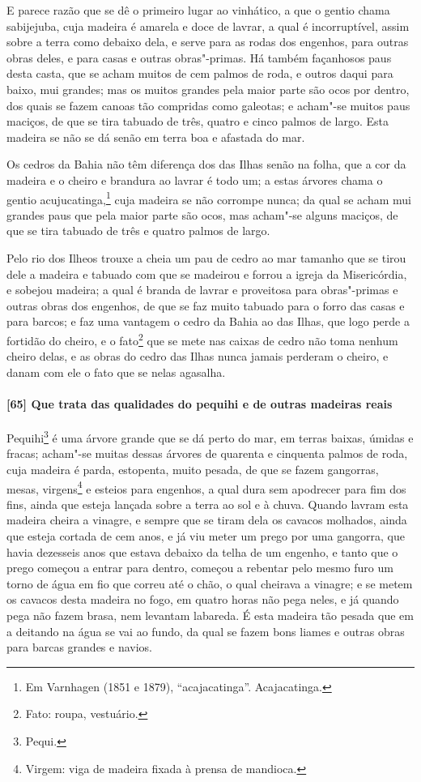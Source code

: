 E parece razão que se dê o primeiro lugar ao vinhático, a que o gentio chama sabijejuba,
cuja madeira é amarela e doce de lavrar, a qual é incorruptível, assim sobre a terra como
debaixo dela, e serve para as rodas dos engenhos, para outras obras deles, e para casas e
outras obras"-primas. Há também façanhosos paus desta casta, que se acham muitos de cem
palmos de roda, e outros daqui para baixo, mui grandes; mas os muitos grandes pela maior
parte são ocos por dentro, dos quais se fazem canoas tão compridas
como galeotas; e acham"-se muitos paus maciços, de que se tira tabuado de três, quatro e
cinco palmos de largo. Esta madeira se não se dá senão em terra boa e afastada do mar.


Os cedros da Bahia não têm diferença dos das Ilhas senão na folha, que a cor da madeira e
o cheiro e brandura ao lavrar é todo um; a estas árvores chama o gentio
acujucatinga,\footnote{ Em Varnhagen (1851 e 1879), ``acajacatinga''. Acajacatinga.} cuja
madeira se não corrompe nunca; da qual se acham mui grandes paus que pela maior parte são
ocos, mas acham"-se alguns maciços, de que se tira tabuado de três e quatro palmos de
largo.

Pelo rio dos Ilheos trouxe a cheia um pau de cedro ao mar tamanho que se tirou dele a
madeira e tabuado com que se madeirou e forrou a igreja da Misericórdia, e sobejou
madeira; a qual é branda de lavrar e proveitosa para obras"-primas e outras obras dos
engenhos, de que se faz muito tabuado para o forro das casas e para barcos; e faz uma
vantagem o cedro da Bahia ao das Ilhas, que logo perde a fortidão do cheiro, e o
fato\footnote{ Fato: roupa, vestuário.} que se mete nas caixas de cedro não toma nenhum
cheiro delas, e as obras do cedro das Ilhas nunca jamais perderam o cheiro, e
danam com ele o fato que se nelas agasalha.

\paragraph{[65] Que trata das qualidades do pequihi e de outras madeiras reais}\quad
Pequihi\footnote{ Pequi.} é uma árvore grande que se dá perto do mar, em terras baixas,
úmidas e fracas; acham"-se muitas dessas árvores de quarenta e cinquenta palmos de roda,
cuja madeira é parda, estopenta, muito pesada, de que se fazem gangorras, mesas,
virgens\footnote{ Virgem: viga de madeira fixada à prensa de mandioca.} e esteios para
engenhos, a qual dura sem apodrecer para fim dos fins, ainda que esteja lançada sobre a
terra ao sol e à chuva. Quando lavram esta madeira cheira a vinagre, e sempre que se tiram
dela os cavacos molhados, ainda que esteja cortada de cem anos, e já viu meter um prego
por uma gangorra, que havia dezesseis anos que estava debaixo da telha de um engenho, e
tanto que o prego começou a entrar para dentro, começou a rebentar pelo mesmo furo um
torno de água em fio que correu até o chão, o qual cheirava a vinagre; e se metem os
cavacos desta madeira no fogo, em quatro horas não pega neles, e já quando pega não fazem
brasa, nem levantam labareda. É esta madeira tão pesada que em a deitando na água se vai
ao fundo, da qual se fazem bons liames e outras obras para barcas grandes e navios.

